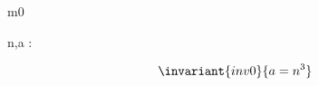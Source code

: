 \documentclass[12pt]{amsart}
\title{}
\author{}
\date{} %
\begin{document}
\maketitle
\tableofcontents


\begin{machine}{m0}

	\begin{variable}
		n,a : \Int
	\end{variable}

\begin{align*}
\invariant{inv0}
{	a = n^3	}
\end{align*}
%



\end{machine}
\end{document}
